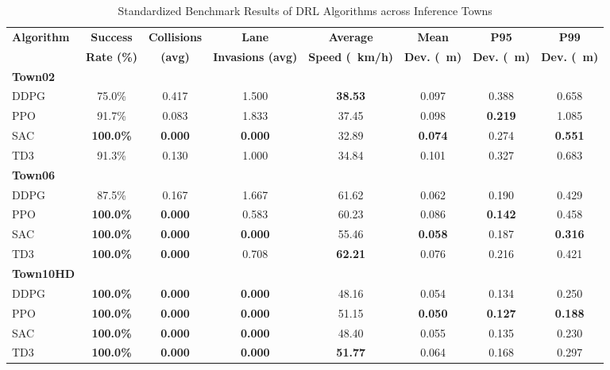 \documentclass[sn-mathphys,Numbered]{sn-jnl}
\begin{document}
\begin{table}[htbp]
\centering
\caption{Standardized Benchmark Results of DRL Algorithms across Inference Towns}
\label{tab:algorithms_benchmark_results}
\footnotesize
\setlength{\tabcolsep}{4.5pt}
\begin{tabular}{lccccccc}
\hline
\textbf{Algorithm} & \textbf{Success} & \textbf{Collisions} & \textbf{Lane} & \textbf{Average} & \textbf{Mean} & \textbf{P95} & \textbf{P99} \\
 & \textbf{Rate (\%)} & \textbf{(avg)} & \textbf{Invasions (avg)} & \textbf{Speed (\SI{}{km/h})} & \textbf{Dev. (\SI{}{\meter})} & \textbf{Dev. (\SI{}{\meter})} & \textbf{Dev. (\SI{}{\meter})} \\
\hline
\textbf{Town02} & & & & & & & \\
\quad DDPG & 75.0\% & 0.417 & 1.500 & \textbf{38.53} & 0.097 & 0.388 & 0.658 \\
\quad PPO  & 91.7\% & 0.083 & 1.833 & 37.45 & 0.098 & \textbf{0.219} & 1.085 \\
\quad SAC  & \textbf{100.0\%} & \textbf{0.000} & \textbf{0.000} & 32.89 & \textbf{0.074} & 0.274 & \textbf{0.551} \\
\quad TD3  & 91.3\% & 0.130 & 1.000 & 34.84 & 0.101 & 0.327 & 0.683 \\
\hline
\textbf{Town06} & & & & & & & \\
\quad DDPG & 87.5\% & 0.167 & 1.667 & 61.62 & 0.062 & 0.190 & 0.429 \\
\quad PPO  & \textbf{100.0\%} & \textbf{0.000} & 0.583 & 60.23 & 0.086 & \textbf{0.142} & 0.458 \\
\quad SAC  & \textbf{100.0\%} & \textbf{0.000} & \textbf{0.000} & 55.46 & \textbf{0.058} & 0.187 & \textbf{0.316} \\
\quad TD3  & \textbf{100.0\%} & \textbf{0.000} & 0.708 & \textbf{62.21} & 0.076 & 0.216 & 0.421 \\
\hline
\textbf{Town10HD} & & & & & & & \\
\quad DDPG & \textbf{100.0\%} & \textbf{0.000} & \textbf{0.000} & 48.16 & 0.054 & 0.134 & 0.250 \\
\quad PPO  & \textbf{100.0\%} & \textbf{0.000} & \textbf{0.000} & 51.15 & \textbf{0.050} & \textbf{0.127} & \textbf{0.188} \\
\quad SAC  & \textbf{100.0\%} & \textbf{0.000} & \textbf{0.000} & 48.40 & 0.055 & 0.135 & 0.230 \\
\quad TD3  & \textbf{100.0\%} & \textbf{0.000} & \textbf{0.000} & \textbf{51.77} & 0.064 & 0.168 & 0.297 \\
\hline
\end{tabular}
\end{table}
\end{document}
